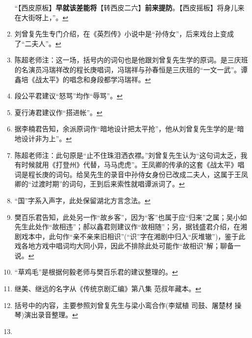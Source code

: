 \begin{enumerate}
  ``【西皮原板】\textbf{早就该差能将}【转西皮二六】\textbf{前来提防}。【西皮摇板】将身儿来在大街呀上，''。\protect\hyperlink{fnref553}{↩}
\item
  \leavevmode\hypertarget{fn554}{}%
  刘曾复先生专门介绍，在《英烈传》小说中是``孙侍女''，后来戏台上变成了``二夫人''。\protect\hyperlink{fnref554}{↩}
\item
  \leavevmode\hypertarget{fn555}{}%
  陈超老师注：这一场，括号内的词句也是他跟刘曾复先生学的原词。是三庆班的名演员冯瑞祥改的程长庚唱词，冯瑞祥与孙春恒是三庆班的``一文一武''。谭鑫培《战太平》的唱念和身段都学冯瑞祥。\protect\hyperlink{fnref555}{↩}
\item
  \leavevmode\hypertarget{fn556}{}%
  段公平君建议``怒骂''均作``辱骂''。\protect\hyperlink{fnref556}{↩}
\item
  \leavevmode\hypertarget{fn557}{}%
  夏行涛君建议作``搭进帐''。\protect\hyperlink{fnref557}{↩}
\item
  \leavevmode\hypertarget{fn558}{}%
  据李楠君告知，余派原词作``暗地设计把太平抢''，他从刘曾复先生学的是``暗地设计非为上''。\protect\hyperlink{fnref558}{↩}
\item
  \leavevmode\hypertarget{fn559}{}%
  陈超老师注：此句原是``止不住珠泪洒衣襟。''刘曾复先生认为``这句词太乏，我有时候就用《打登州》代替，马马虎虎''。王凤卿的传承的这套《战太平》唱词是程长庚的词句。给吴先生的录音中孙侍女身份已改成二夫人，这属于王凤卿的``过渡时期''的词句，王到后来索性就唱谭派词了。\protect\hyperlink{fnref559}{↩}
\item
  \leavevmode\hypertarget{fn560}{}%
  ``国''字系入声字，此处保留湖北方言念法。\protect\hyperlink{fnref560}{↩}
\item
  \leavevmode\hypertarget{fn561}{}%
  樊百乐君告知，此处另一作``故乡客''，因为``客''也属于应``归来''之属；吴小如先生此处作``故相违''；郝以鑫君则建议作``故相随''；另，据钱盛君介绍，在湘剧戏本中，此句作``亲不亲来旧相识''(``识''字在湘剧中归入``灰堆辙'')，鉴于此戏各地方戏中唱词均大同小异，因此不排除此处可能作``故相识''解；聊备一说。\protect\hyperlink{fnref561}{↩}
\item
  \leavevmode\hypertarget{fn562}{}%
  ``草鸡毛''是根据何毅老师与樊百乐君的建议整理的。\protect\hyperlink{fnref562}{↩}
\item
  \leavevmode\hypertarget{fn563}{}%
  继美、继远的名字从《传统京剧汇编》第八集
  范叔年藏本。\protect\hyperlink{fnref563}{↩}
\item
  \leavevmode\hypertarget{fn564}{}%
  括号中的内容，主要参照刘曾复先生与梁小鸾合作(李斌植 司鼓、屠楚材
  操琴)演出录音整理。\protect\hyperlink{fnref564}{↩}
\item

\end{enumerate}
